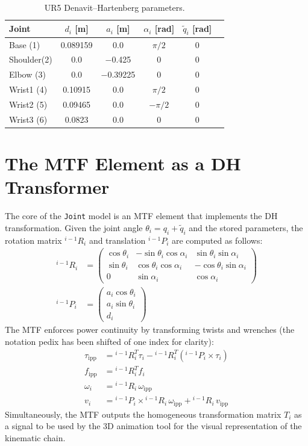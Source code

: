 \begin{table}[H]
  \centering
  \caption{UR5 Denavit--Hartenberg parameters.}
  \label{tab:dh_params}
  \begin{tabular}{@{}lccccc@{}}
    \toprule
    Joint & $d_i$ [m] & $a_i$ [m] & $\alpha_i$ [rad] & $\tilde{q}_i$ [rad] \\
    \midrule
    Base   (1) & 0.089159 &  0.0       & $\pi/2$   & 0 \\
    Shoulder(2)& 0.0      & $-$0.425   & 0         & 0 \\
    Elbow  (3) & 0.0      & $-$0.39225 & 0         & 0 \\
    Wrist1 (4) & 0.10915  &  0.0       & $\pi/2$   & 0 \\
    Wrist2 (5) & 0.09465  &  0.0       & $-\pi/2$  & 0 \\
    Wrist3 (6) & 0.0823   &  0.0       & 0         & 0 \\
    \bottomrule
  \end{tabular}
\end{table}

\section{The MTF Element as a DH Transformer}

The core of the \texttt{Joint} model is an MTF element that implements the DH transformation.
Given the joint angle $\theta_i = q_i + \tilde{q}_i$ and the stored parameters, the rotation matrix $^{i-1}R_i$ and translation $^{i-1}P_i$ are computed as follows:
\begin{align}
  ^{i-1}R_i &= \begin{pmatrix}
    \cos\theta_i & -\sin\theta_i\cos\alpha_i &  \sin\theta_i\sin\alpha_i \\
    \sin\theta_i &  \cos\theta_i\cos\alpha_i & -\cos\theta_i\sin\alpha_i \\
    0            &  \sin\alpha_i             &  \cos\alpha_i
  \end{pmatrix} \\[6pt]
  ^{i-1}P_i &= \begin{pmatrix}
    a_i\cos\theta_i \\ a_i\sin\theta_i \\ d_i
  \end{pmatrix}
\end{align}
The MTF enforces power continuity by transforming twists and wrenches (the notation pedix has been shifted of one index for clarity):
\begin{align}
  \tau_{\text{ipp}} &= {}^{i-1}R_i^T \tau_i - {}^{i-1}R_i^T ({ }^{i-1}P_i \times \tau_i) \\
  f_{\text{ipp}}    &= {}^{i-1}R_i^T f_i  \\
  \omega_i          &= {}^{i-1}R_i\,\omega_{\text{ipp}} \\
  v_i               &= {}^{i-1}P_i \times {}^{i-1}R_i\,\omega_{\text{ipp}} + {}^{i-1}R_i\,v_{\text{ipp}}
\end{align}
Simultaneously, the MTF outputs the homogeneous transformation matrix $T_i$ as a signal to be used by the 3D animation tool for the visual representation of the kinematic chain.

